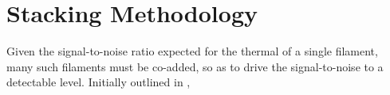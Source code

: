 \chapter{Stacking Methodology}
Given the signal-to-noise ratio expected for the thermal \sze of a single filament, many such filaments must be co-added, so as to drive the signal-to-noise to a detectable level. Initially outlined in \cite{2016MNRAS.457.2391C}, 
